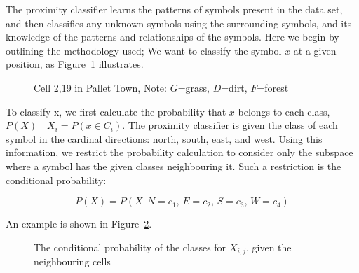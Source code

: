 
The proximity classifier learns the patterns of symbols present in the data set,
and then classifies any unknown symbols using the surrounding symbols, and its
knowledge of the patterns and relationships of the symbols. Here we begin by
outlining the methodology used; We want to classify the symbol $x$ at a given
position, as Figure~\ref{fig:neighbours} illustrates.

\begin{figure}[h]
\begin{center}
\end{center}
\caption{Cell 2,19 in Pallet Town, Note: $G$=grass, $D$=dirt, $F$=forest}
\label{fig:neighbours}
\end{figure}

To classify x, we first calculate the probability that $x$ belongs to each
class, $P(X)\quad X_i = P(x\!\in\! C_i)$. The proximity classifier is given the
class of each symbol in the cardinal directions: north, south, east, and west.
Using this information, we restrict the probability calculation to consider
only the subspace where a symbol has the given classes neighbouring it. Such a
restriction is the conditional probability:

\[
P(X) = P(X|\,N\!=\!c_1,\,E\!=\!c_2,\,S\!=\!c_3,\,W\!=\!c_4)
\]

An example is shown in Figure~\ref{fig:conditionalprob}.

\begin{figure}[h]
\begin{center}
\end{center}
\caption{The conditional probability of the classes for $X_{i,j}$, given the neighbouring cells}
\label{fig:conditionalprob}
\end{figure}


